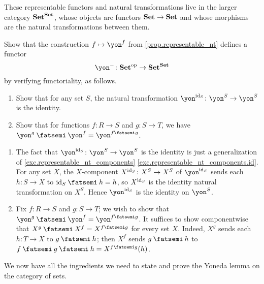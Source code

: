 \documentclass[Book-Poly]{subfiles}
\begin{document}
These representable functors and natural transformations live in the larger category $\mathbf{Set}^{\mathbf{Set}}$, whose objects are functors $\mathbf{Set}\to\mathbf{Set}$ and whose morphisms are the natural transformations between them.

\begin{exercise} \label{exc.representable_nt_functorial}
    Show that the construction $f\mapsto\yon^f$ from \cref{prop.representable_nt} defines a functor
    \begin{equation} \label{eqn.yoneda_embedding}
        \yon^-\colon\smset\op\to\smset^\smset
    \end{equation}
    by verifying functoriality, as follows.
    \begin{enumerate}
        \item Show that for any set $S$, the natural transformation $\yon^{\id_S}\colon\yon^S\to\yon^S$ is the identity.
        \item Show that for functions $f\colon R\to S$ and $g\colon S\to T$, we have $\yon^g\then\yon^f=\yon^{f\then g}$. \qedhere
    \end{enumerate}

    \begin{solution}
        \begin{enumerate}
            \item The fact that $\yon^{\id_S}\colon\yon^S\to\yon^S$ is the identity is just a generalization of \cref{exc.representable_nt_components} \cref{exc.representable_nt_components.id}.
            For any set $X$, the $X$-component $X^{\mathrm{id}_S} \colon X^S \to X^S$ of $\yon^{\id_S}$ sends each $h \colon S \to X$ to $\id_S \then h = h$, so $X^{\mathrm{id}_S}$ is the identity natural transformation on $X^S$.
            Hence $\yon^{\id_S}$ is the identity on $\yon^S$.
            \item Fix $f \colon R \to S$ and $g \colon S \to T$; we wish to show that $\yon^g \then \yon^f = \yon^{f \then g}$.
            It suffices to show componentwise that $X^g \then X^f = X^{f \then g}$ for every set $X$.
            Indeed, $X^g$ sends each $h \colon T \to X$ to $g \then h$; then $X^f$ sends $g \then h$ to $f \then g \then h = X^{f \then g}(h)$.
        \end{enumerate}
    \end{solution}
\end{exercise}

We now have all the ingredients we need to state and prove the Yoneda lemma on the category of sets.
\end{document}
